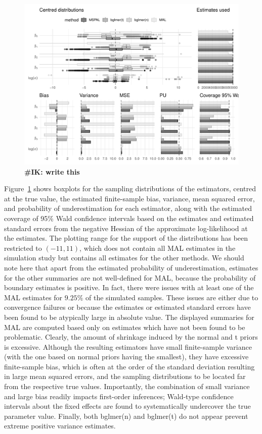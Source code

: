\documentclass[11pt, a4paper]{article}
\newcommand{\IK}[1]{{\noindent \color{blue} \bf \#IK: #1}}
\theoremstyle{example} \newtheorem{example}{Example}[section]
\theoremstyle{theorem} \newtheorem{theorem}{Theorem}[section]
\begin{document}
\begin{figure}[t]
  \begin{center}
    \includegraphics[width = \textwidth]{Figures/simulation_results.pdf}
  \end{center}
  \caption{\IK{write this}}
  \label{fig:culcita_simu0}
\end{figure}

Figure~\ref{fig:culcita_simu0} shows boxplots for the sampling
distributions of the estimators, centred at the true value, the estimated
finite-sample bias, variance, mean squared error, and probability of
underestimation for each estimator, along with the estimated coverage
of 95\% Wald confidence intervals based on the estimates and estimated
standard errors from the negative Hessian of the approximate
log-likelihood at the estimates. The plotting range for the support of
the distributions has been restricted to $(-11, 11)$, which does not
contain all MAL estimates in the simulation study but contains all
estimates for the other methods. We should note here that apart from
the estimated probability of underestimation,
estimates for the other summaries are not well-defined for MAL,
because the probability of boundary estimates is positive. In fact,
there were issues with at least one of the MAL estimates for $9.25\%$
of the simulated samples. These issues are either due to convergence
failures or because the estimates or estimated standard errors have
been found to be atypically large in absolute value. The displayed
summaries for MAL are computed based only on estimates which have not
been found to be problematic. Clearly, the amount of shrinkage induced
by the normal and t priors is excessive. Although the resulting
estimators have small finite-sample variance (with the one based on
normal priors having the smallest), they have excessive finite-sample
bias, which is often at the order of the standard deviation resulting
in large mean squared errors, and the sampling distributions to be
located far from the respective true values. Importantly, the
combination of small variance and large bias readily impacts
first-order inferences; Wald-type confidence intervals about the fixed
effects are found to systematically undercover the true parameter
value. Finally, both bglmer(n) and bglmer(t) do not appear prevent extreme positive variance estimates.
\end{document}
